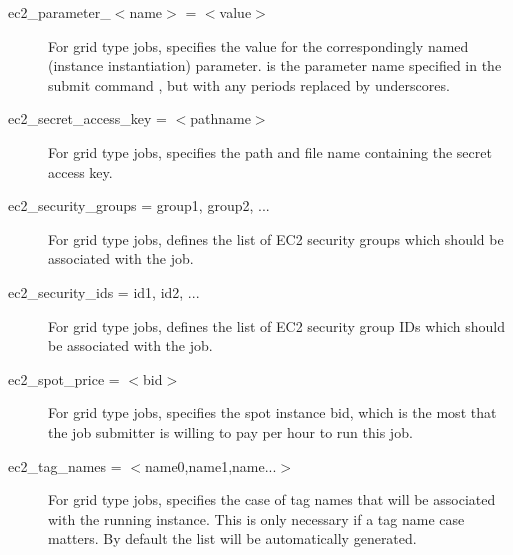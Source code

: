 \begin{description}

\item[ec2\_parameter\_$<$name$>$ = $<$value$>$]
For grid type  jobs,
specifies the value for the correspondingly named (instance instantiation)
parameter.  
 is the parameter name specified in the
submit command ,
but with any periods replaced by underscores.


\label{condor-submit-ec2-access-key}
\item[ec2\_secret\_access\_key = $<$pathname$>$]
For grid type  jobs,
specifies the path and file name containing the secret access key.


\label{condor-submit-ec2-security-groups}
\item[ec2\_security\_groups = group1, group2, ...]
For grid type  jobs, 
defines the list of EC2 security groups which
should be associated with the job.


\label{condor-submit-ec2-security-ids}
\item[ec2\_security\_ids = id1, id2, ...]
For grid type  jobs,
defines the list of EC2 security group IDs which
should be associated with the job.


\label{condor-submit-ec2-spot-price}
\item[ec2\_spot\_price = $<$bid$>$]
For grid type  jobs, 
specifies the spot instance bid, which is the most that the job submitter
is willing to pay per hour to run this job.


\label{condor-submit-ec2-tag-names}
\item[ec2\_tag\_names = $<$name0,name1,name...$>$]
For grid type  jobs, 
specifies the case of tag names that will be associated with the
running instance.
This is only necessary if a tag name case matters.
By default the list will be automatically generated.


\end{description}
